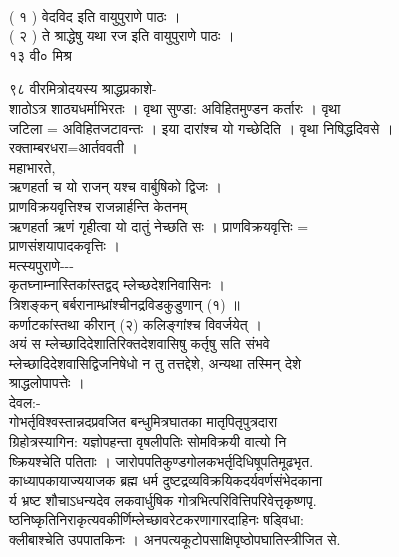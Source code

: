 \documentclass[11pt, openany]{book}
\begin{document}
{{{{{{{{{%

{\\
( १ ) वेदविद इति वायुपुराणे पाठः ।\\
( २ ) ते श्राद्धेषु यथा रज इति वायुपुराणे पाठः ।\\
१३ वी० मिश्र

{९८ }{वीरमित्रोदयस्य श्राद्धप्रकाशे-}{\\
शाठोऽत्र शाठ्यधर्माभिरतः । वृथा सुण्डा: अविहितमुण्डन कर्तारः । वृथा\\
जटिला = अविहितजटावन्तः । इया दारांश्च यो गच्छेदिति । वृथा निषिद्धदिवसे
।\\
रक्ताम्बरधरा=आर्तववती ।\\
महाभारते,\\
ऋणहर्ता च यो राजन् यश्च वार्बुषिको द्विजः ।\\
प्राणविक्रयवृत्तिश्च राजन्नार्हन्ति केतनम् \textbar{}\textbar{}\\
ऋणहर्ता ऋणं गृहीत्वा यो दातुं नेच्छति सः । प्राणविक्रयवृत्तिः =\\
प्राणसंशयापादकवृत्तिः ।\\
मत्स्यपुराणे-\/-\/-\\
कृतघ्नाम्नास्तिकांस्तद्वद् म्लेच्छदेशनिवासिनः ।\\
त्रिशङ्कन् बर्बरानाम्ध्रांश्चीनद्रविडकुडुणान् (१) ॥\\
कर्णाटकांस्तथा कीरान् (२) कलिङ्गांश्च विवर्जयेत् ।\\
अयं स म्लेच्छादिदेशातिरिक्तदेशवासिषु कर्तृषु सति संभवे\\
म्लेच्छादिदेशवासिद्विजनिषेधो न तु तत्तद्देशे, अन्यथा तस्मिन् देशे\\
श्राद्धलोपापत्तेः ।\\
देवल:-\\
गोभर्तृविश्वस्तान्नदप्रवजित बन्धुमित्रघातका मातृपितृपुत्रदारा\\
ग्रिहोत्रस्यागिन: यज्ञोपहन्ता वृषलीपतिः सोमविक्रयी वात्यो नि\\
ष्क्रियश्चेति पतिताः । जारोपपतिकुण्डगोलकभर्तृदिधिषूपतिमूढभृत.\\
काध्यापकायाज्ययाजक ब्रह्म धर्म दुष्टद्रव्यविक्रयिकदर्यवर्णसंभेदकाना\\
र्य भ्रष्ट शौचाऽधन्यदेव लकवार्धुषिक
गोत्रभित्परिवित्तिपरिवेत्तृकृष्णपृ.\\
ष्ठनिष्कृतिनिराकृत्यवकीर्णिम्लेच्छावरेटकरणागारदाहिनः षड्विधा:\\
क्लीबाश्चेति उपपातकिनः । अनपत्यकूटोपसाक्षिपृष्ठोपघातिस्त्रीजित से.\\
}}}}}}}}}}}
\end{document}

